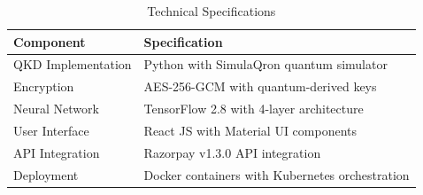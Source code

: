 \begin{table}[!htb]
\centering
\begin{tabular}{|p{4cm}|p{8cm}|}
\hline
\textbf{Component} & \textbf{Specification} \\
\hline
QKD Implementation & Python with SimulaQron quantum simulator \\
\hline
Encryption & AES-256-GCM with quantum-derived keys \\
\hline
Neural Network & TensorFlow 2.8 with 4-layer architecture \\
\hline
User Interface & React JS with Material UI components \\
\hline
API Integration & Razorpay v1.3.0 API integration \\
\hline
Deployment & Docker containers with Kubernetes orchestration \\
\hline
\end{tabular}
\caption{Technical Specifications}
\label{tab:tech_specs}
\end{table} 